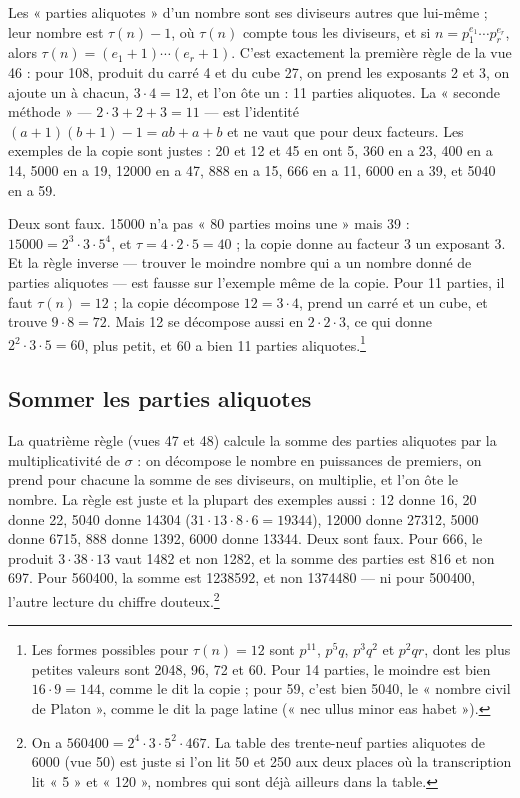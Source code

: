 \documentclass[11pt,a4paper]{article}
\begin{document}
Les « parties aliquotes » d'un nombre sont ses diviseurs autres que lui-même ;
leur nombre est $\tau(n) - 1$, où $\tau(n)$ compte tous les diviseurs, et si
$n = p_1^{e_1}\cdots p_r^{e_r}$, alors $\tau(n) = (e_1+1)\cdots(e_r+1)$. C'est
exactement la première règle de la vue 46 : pour 108, produit du carré 4 et du
cube 27, on prend les exposants 2 et 3, on ajoute un à chacun, $3 \cdot 4 = 12$,
et l'on ôte un : 11 parties aliquotes. La « seconde méthode » —
$2 \cdot 3 + 2 + 3 = 11$ — est l'identité $(a+1)(b+1) - 1 = ab + a + b$ et ne vaut
que pour deux facteurs. Les exemples de la copie sont justes : 20 et 12 et 45
en ont 5, 360 en a 23, 400 en a 14, 5000 en a 19, 12000 en a 47, 888 en a 15,
666 en a 11, 6000 en a 39, et 5040 en a 59.

Deux sont faux. 15000 n'a pas « 80 parties moins une » mais 39 :
$15000 = 2^3 \cdot 3 \cdot 5^4$, et $\tau = 4 \cdot 2 \cdot 5 = 40$ ; la copie
donne au facteur 3 un exposant 3. Et la règle inverse — trouver le moindre
nombre qui a un nombre donné de parties aliquotes — est fausse sur l'exemple
même de la copie. Pour 11 parties, il faut $\tau(n) = 12$ ; la copie décompose
$12 = 3 \cdot 4$, prend un carré et un cube, et trouve $9 \cdot 8 = 72$. Mais
12 se décompose aussi en $2 \cdot 2 \cdot 3$, ce qui donne
$2^2 \cdot 3 \cdot 5 = 60$, plus petit, et 60 a bien 11 parties
aliquotes.\footnote{Les formes possibles pour $\tau(n) = 12$ sont $p^{11}$,
$p^5 q$, $p^3 q^2$ et $p^2 q r$, dont les plus petites valeurs sont 2048, 96, 72
et 60. Pour 14 parties, le moindre est bien $16 \cdot 9 = 144$, comme le dit la
copie ; pour 59, c'est bien 5040, le « nombre civil de Platon », comme le dit la
page latine (« nec ullus minor eas habet »).}

\subsection*{Sommer les parties aliquotes}

La quatrième règle (vues 47 et 48) calcule la somme des parties aliquotes par la
multiplicativité de $\sigma$ : on décompose le nombre en puissances de premiers,
on prend pour chacune la somme de ses diviseurs, on multiplie, et l'on ôte le
nombre. La règle est juste et la plupart des exemples aussi : 12 donne 16, 20
donne 22, 5040 donne 14304 ($31 \cdot 13 \cdot 8 \cdot 6 = 19344$), 12000 donne
27312, 5000 donne 6715, 888 donne 1392, 6000 donne 13344. Deux sont faux. Pour
666, le produit $3 \cdot 38 \cdot 13$ vaut 1482 et non 1282, et la somme des
parties est 816 et non 697. Pour 560400, la somme est 1238592, et non 1374480 —
ni pour 500400, l'autre lecture du chiffre douteux.\footnote{On a $560400 =
2^4 \cdot 3 \cdot 5^2 \cdot 467$. La table des trente-neuf parties aliquotes de
6000 (vue 50) est juste si l'on lit 50 et 250 aux deux places où la transcription
lit « 5 » et « 120 », nombres qui sont déjà ailleurs dans la table.}
\end{document}
